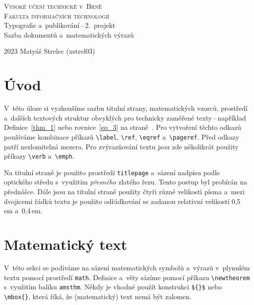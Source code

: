 \documentclass[11pt, twocolumn, a4paper]{article}
\begin{document}
\begin{titlepage}
	\begin{center}
		
		\textsc{
			\Huge{Vysoké učení technické v~Brně\\[0.4em]}
			\huge{Fakulta informačních technologií}\\
		}
		\LARGE{
			Typografie a~publikování\,{}--\,{}2.\ projekt\\[0.5em]
			Sazba dokumentů a~matematických výrazů\\
		}
	\end{center}
	{\Large{
		2023
		\hfill
		Matyáš Strelec (xstrel03)
		}
	}
\end{titlepage}

\newpage

\label{1}

\section*{Úvod}
V~této úloze si vyzkoušíme sazbu titulní strany, matematických vzorců, prostředí
a~dalších textových struktur obvyklých pro technicky zaměřené texty\,{}--\,{}například
Definice~\ref{thm_1} nebo rovnice~\eqref{eq_3} na straně~\pageref{1}. Pro vytvoření těchto
odkazů používáme kombinace příkazů \verb|\label|, \verb|\ref|, \verb|\eqref| a~\verb|\pageref|. Před odkazy
patří nezlomitelná mezera. Pro zvýrazňování textu jsou zde několikrát použity příkazy
\verb|\verb| a~\verb|\emph|.

Na titulní straně je použito prostředí \verb|titlepage| a~sázení nadpisu podle optického středu s~využitím \emph{přesného}
zlatého řezu. Tento postup byl probírán na přednášce. Dále jsou na titulní straně použity čtyři různé velikosti písma a~mezi
dvojicemi řádků textu je použito odřádkování se zadanou relativní velikostí 0,5\,em a~0,4\,em\footnotemark{}.


\section{Matematický text}
V~této sekci se podíváme na sázení matematických symbolů a~výrazů v~plynulém textu pomocí prostředí \verb|math|. Definice
a~věty sázíme pomocí příkazu \verb|\newtheorem| s~využitím balíku \verb|amsthm|. Někdy je vhodné použít konstrukci \verb|${}$|
nebo \verb|\mbox{}|, která říká, že (matematický) text nemá být zalomen.
\end{document}
